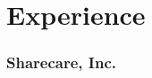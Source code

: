 \newcommand{\headerrow}[3] {
\item[] \textbf{#1} \hfill #3}
%
\newenvironment{position}{
  \begin{itemize}[leftmargin=*]
    \setlength{\itemsep}{1pt}
    \setlength{\parskip}{0pt}
    \setlength{\parsep}{0pt}
}{\end{itemize}}

\section{Experience}

\subsubsection{Sharecare, Inc.}


